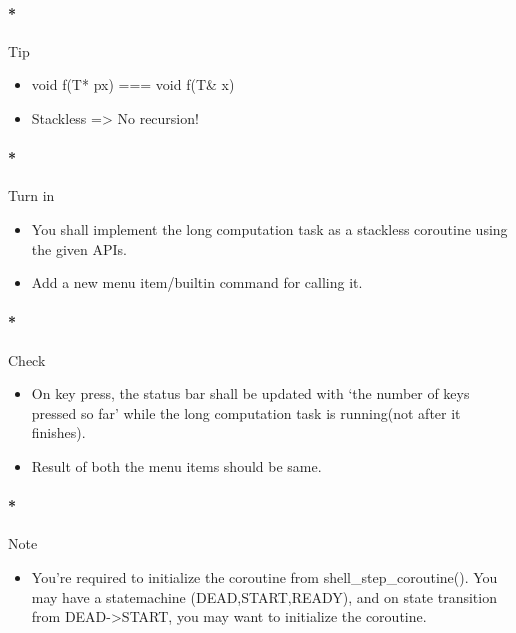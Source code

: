 \documentclass[]{article}
\providecommand{\tightlist}{%
  \setlength{\itemsep}{0pt}\setlength{\parskip}{0pt}}
\let\oldparagraph\paragraph
\renewcommand{\paragraph}[1]{\oldparagraph{#1}\mbox{}}
\begin{document}
\paragraph*{Tip}\label{tip-4}

\begin{itemize}
\tightlist
\item
  void f(T* px) === void f(T\& x)
\item
  Stackless =\textgreater{} No recursion!
\end{itemize}

\paragraph*{Turn in}\label{turn-in-4}

\begin{itemize}
\tightlist
\item
  You shall implement the long computation task as a stackless coroutine
  using the given APIs.
\item
  Add a new menu item/builtin command for calling it.
\end{itemize}

\paragraph*{Check}\label{check-4}

\begin{itemize}
\tightlist
\item
  On key press, the status bar shall be updated with `the number of keys
  pressed so far' while the long computation task is running(not after
  it finishes).
\item
  Result of both the menu items should be same.
\end{itemize}

\paragraph*{Note}\label{note-5}

\begin{itemize}
\tightlist
\item
  You're required to initialize the coroutine from
  shell\_step\_coroutine(). You may have a statemachine
  (DEAD,START,READY), and on state transition from
  DEAD-\textgreater{}START, you may want to initialize the coroutine.
\end{itemize}
\end{document}
